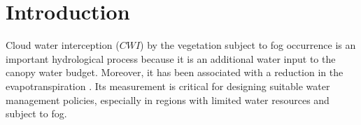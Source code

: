 \documentclass[a4paper,12pt]{article}
\begin{document}
{\let\thefootnote\relax{}}
{\let\thefootnote\relax{}}
{\let\thefootnote\relax{}}
{\let\thefootnote\relax{}}
{\let\thefootnote\relax{}}


\section{Introduction}
Cloud water interception ($CWI$) by the vegetation subject to fog occurrence is an important hydrological process because it is an additional water input to the canopy water budget. Moreover, it has been associated with a reduction in the evapotranspiration \citep{Bruijnzeel2001, Ritteretal2008}. Its measurement is critical for designing suitable water management policies, especially in regions with limited water resources and subject to fog. 
\end{document}
